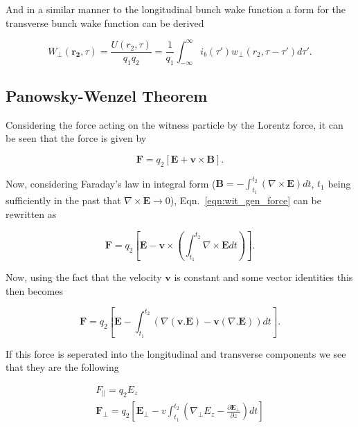 And in a similar manner to the longitudinal bunch wake function a form for the transverse bunch wake function can be derived

\begin{equation}
W_{\perp}\left( \mathbf{r_{2}}, \tau \right) = \frac{U\left( r_{2}, \tau \right) }{q_{1} q_{2}} = \frac{1}{q_{1}}\int^{\infty}_{-\infty}i_{b}\left( \tau{}' \right) w_{\perp}\left( r_{2}, \tau{}-\tau{}'\right) d\tau{}' .
\end{equation}

\subsection{Panowsky-Wenzel Theorem}
\label{sec:PanWen}

Considering the force acting on the witness particle by the Lorentz force, it can be seen that the force is given by 

\begin{equation}
\mathbf{F} = q_{2} \left[\mathbf{E} + \mathbf{v}\times \mathbf{B} \right].
\label{eqn:wit_gen_force}
\end{equation}

Now, considering Faraday's law in integral form ($\mathbf{B} = -\int^{t_{2}}_{t_{1}} \left( \nabla \times \mathbf{E} \right) dt$, $t_{1}$ being sufficiently in the past that $\nabla \times \mathbf{E} \rightarrow 0$), Eqn.~\ref{eqn:wit_gen_force} can be rewritten as

\begin{equation}
\mathbf{F} = q_{2}  \left[\mathbf{E} - \mathbf{v}\times\left(  \int^{t_{2}}_{t_{1}} \nabla \times \mathbf{E} dt \right) \right].
\end{equation}

Now, using the fact that the velocity $\mathbf{v}$ is constant and some vector identities this then becomes

\begin{equation}
\mathbf{F} = q_{2}  \left[\mathbf{E} - \int^{t_{2}}_{t_{1}}\left(  \nabla \left( \mathbf{v} . \mathbf{E} \right)  - \mathbf{v}\left( \nabla . \mathbf{E} \right) \right) dt  \right].
\end{equation}

If this force is seperated into the longitudinal and transverse components we see that they are the following

\begin{align}
F_{\parallel} = q_{2} E_{z} \\
\mathbf{F}_{\perp} = q_{2}  \left[\mathbf{E_{\perp}} - v \int^{t_{2}}_{t_{1}}\left(  \nabla_{\perp}E_{z}  - \frac{\partial\mathbf{E}_{\perp}}{\partial z} \right) dt  \right]
\end{align}

